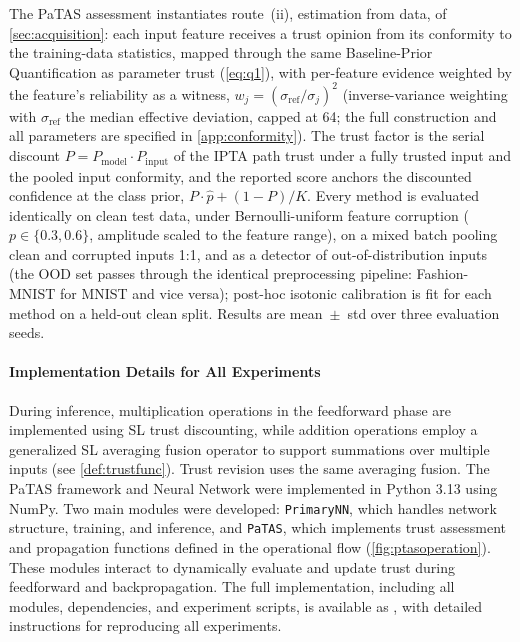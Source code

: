 The PaTAS assessment instantiates route~(ii), estimation from data, of \cref{sec:acquisition}: each input feature receives a trust opinion from its conformity to the training-data statistics, mapped through the same Baseline-Prior Quantification as parameter trust (\cref{eq:q1}), with per-feature evidence weighted by the feature's reliability as a witness, $w_j = (\sigma_{\mathrm{ref}}/\sigma_j)^2$ (inverse-variance weighting with $\sigma_{\mathrm{ref}}$ the median effective deviation, capped at 64; the full construction and all parameters are specified in \cref{app:conformity}). The trust factor is the serial discount $P = P_{\mathrm{model}} \cdot P_{\mathrm{input}}$ of the IPTA path trust under a fully trusted input and the pooled input conformity, and the reported score anchors the discounted confidence at the class prior, $P \cdot \hat{p} + (1-P)/K$. Every method is evaluated identically on clean test data, under Bernoulli-uniform feature corruption ($p \in \{0.3, 0.6\}$, amplitude scaled to the feature range), on a mixed batch pooling clean and corrupted inputs 1:1, and as a detector of out-of-distribution inputs (the OOD set passes through the identical preprocessing pipeline: Fashion-MNIST for MNIST and vice versa); post-hoc isotonic calibration is fit for each method on a held-out clean split. Results are mean~$\pm$~std over three evaluation seeds.

\paragraph*{Implementation Details for All Experiments}
During inference, multiplication operations in the feedforward phase are implemented using SL trust discounting, while addition operations employ a generalized SL averaging fusion operator to support summations over multiple inputs (see \cref{def:trustfunc}). Trust revision uses the same averaging fusion. The PaTAS framework and Neural Network were implemented in Python 3.13 using NumPy. Two main modules were developed: \texttt{PrimaryNN}, which handles network structure, training, and inference, and \texttt{PaTAS}, which implements trust assessment and propagation functions defined in the operational flow (\cref{fig:ptasoperation}). These modules interact to dynamically evaluate and update trust during feedforward and backpropagation. The full implementation, including all modules, dependencies, and experiment scripts, is available as \suppp, with detailed instructions for reproducing all experiments.

\vspace{-0.5em}
